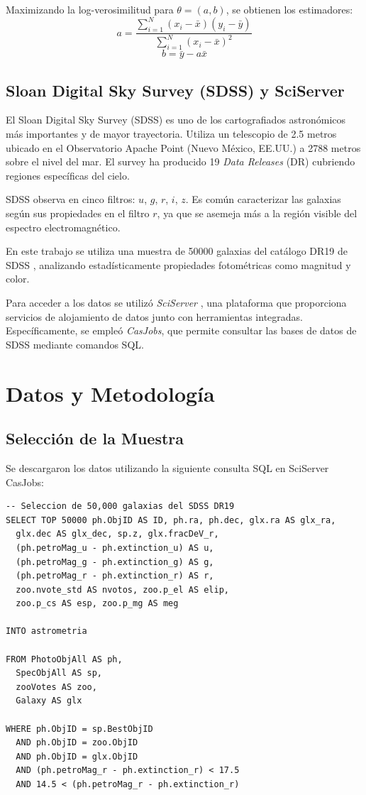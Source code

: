 \documentclass[twocolumn]{article}
\begin{document}
Maximizando la log-verosimilitud para $\theta = (a,b)$, se obtienen los estimadores:
\[
a = \frac{\sum_{i=1}^{N}(x_i - \bar{x})(y_i - \bar{y})}{\sum_{i=1}^{N}(x_i - \bar{x})^2}
\]
\[
b = \bar{y} - a\bar{x}
\]

\subsection{Sloan Digital Sky Survey (SDSS) y SciServer}

El Sloan Digital Sky Survey (SDSS) es uno de los cartografiados astronómicos más importantes y de mayor trayectoria. Utiliza un telescopio de 2.5 metros ubicado en el Observatorio Apache Point (Nuevo México, EE.UU.) a 2788 metros sobre el nivel del mar. El survey ha producido 19 \textit{Data Releases} (DR) cubriendo regiones específicas del cielo.

SDSS observa en cinco filtros: $u$, $g$, $r$, $i$, $z$. Es común caracterizar las galaxias según sus propiedades en el filtro $r$, ya que se asemeja más a la región visible del espectro electromagnético.

En este trabajo se utiliza una muestra de 50000 galaxias del catálogo DR19 de SDSS \citep{SDSSDR19}, analizando estadísticamente propiedades fotométricas como magnitud y color.

Para acceder a los datos se utilizó \textit{SciServer} \citep{2016SciServer}, una plataforma que proporciona servicios de alojamiento de datos junto con herramientas integradas. Específicamente, se empleó \textit{CasJobs}, que permite consultar las bases de datos de SDSS mediante comandos SQL.

\section{Datos y Metodología}

\subsection{Selección de la Muestra}

Se descargaron los datos utilizando la siguiente consulta SQL en SciServer CasJobs:

\begin{lstlisting}[style=sqlstyle, caption={Consulta SDSS CasJobs}]
-- Seleccion de 50,000 galaxias del SDSS DR19
SELECT TOP 50000 ph.ObjID AS ID, ph.ra, ph.dec, glx.ra AS glx_ra, 
  glx.dec AS glx_dec, sp.z, glx.fracDeV_r,  
  (ph.petroMag_u - ph.extinction_u) AS u, 
  (ph.petroMag_g - ph.extinction_g) AS g, 
  (ph.petroMag_r - ph.extinction_r) AS r, 
  zoo.nvote_std AS nvotos, zoo.p_el AS elip, 
  zoo.p_cs AS esp, zoo.p_mg AS meg
  
INTO astrometria
  
FROM PhotoObjAll AS ph, 
  SpecObjAll AS sp,
  zooVotes AS zoo,
  Galaxy AS glx
  
WHERE ph.ObjID = sp.BestObjID 
  AND ph.ObjID = zoo.ObjID
  AND ph.ObjID = glx.ObjID
  AND (ph.petroMag_r - ph.extinction_r) < 17.5
  AND 14.5 < (ph.petroMag_r - ph.extinction_r)
\end{lstlisting}
\end{document}
